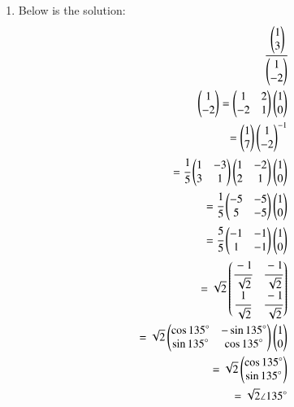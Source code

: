 \begin{enumerate}[label=\thesection.\arabic*.,ref=\thesection.\theenumi]
\begin{enumerate}
\item Below is the solution:
\begin{align}
    \cfrac{\begin{pmatrix}1 \\ 3\end{pmatrix}}{\begin{pmatrix}1 \\ -2\end{pmatrix}}
\\
    \begin{pmatrix}1 \\ -2\end{pmatrix} = \begin{pmatrix}1 & 2\\-2 & 1\end{pmatrix}\begin{pmatrix}1 \\ 0\end{pmatrix}
\\
    =\begin{pmatrix}1 \\ 7\end{pmatrix}\begin{pmatrix}1\\-2\end{pmatrix}^{-1}
\\
    =\cfrac{1}{5}\begin{pmatrix}1 & -3\\3 & 1\end{pmatrix}\begin{pmatrix}1 & -2\\2 & 1\end{pmatrix}\begin{pmatrix}1 \\ 0\end{pmatrix}
\\
    =\cfrac{1}{5}\begin{pmatrix}-5 & -5\\5 & -5\end{pmatrix}\begin{pmatrix}1 \\ 0\end{pmatrix}
\\
    =\cfrac{5}{5}\begin{pmatrix}-1 & -1\\1 & -1\end{pmatrix}\begin{pmatrix}1 \\ 0\end{pmatrix}
\\
    =\sqrt{2}\begin{pmatrix}\cfrac{-1}{\sqrt{2}} & \cfrac{-1}{\sqrt{2}} \\ \cfrac{1}{\sqrt{2}} & \cfrac{-1}{\sqrt{2}}\end{pmatrix}
\\
    =\sqrt{2}\begin{pmatrix}\cos{135}\degree & -\sin{135}\degree\\ \sin{135}\degree & \cos{135}\degree\end{pmatrix}\begin{pmatrix}1 \\ 0\end{pmatrix}
\\
    =\sqrt{2}\begin{pmatrix}\cos{135}\degree \\ \sin{135}\degree\end{pmatrix}
\\
    =\sqrt{2} \angle 135 \degree
\end{align}
\end{enumerate}
\end{enumerate}


